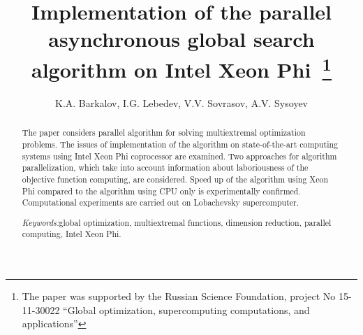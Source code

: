 \documentclass[a4paper]{article}
\begin{document}
\title{Implementation of the parallel asynchronous global search algorithm on Intel Xeon Phi\
\footnote{
The paper was supported by the Russian Science Foundation, project No 15-11-30022 “Global optimization, supercomputing  computations, and applications”}}
\author{K.A. Barkalov, I.G. Lebedev, V.V. Sovrasov, A.V. Sysoyev}
\date{}
\maketitle

\begin{abstract}
The paper considers parallel algorithm for solving multiextremal optimization problems. The issues of implementation of the algorithm on state-of-the-art computing systems using Intel Xeon Phi coprocessor are examined. Two approaches for algorithm parallelization, which take into account information about laboriousness of the objective function computing, are considered. Speed up of the algorithm using Xeon Phi compared to the algorithm using CPU only is experimentally confirmed. Computational experiments are carried out on Lobachevsky supercomputer.
\par
\textit{Keywords:}global optimization, multiextremal functions, dimension reduction, parallel computing, Intel Xeon Phi.
\end{abstract}
\nocite{*}
\end{document}

